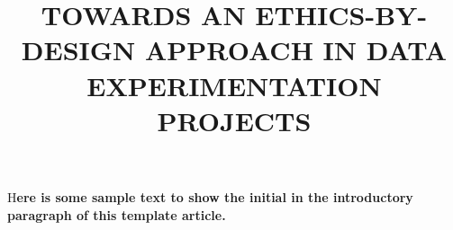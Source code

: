 \documentclass[	DIV=calc,%
							paper=a4,%
							fontsize=11pt,%
							twocolumn, draft]{scrartcl}	 					%
\title{TOWARDS AN ETHICS-BY-DESIGN APPROACH IN DATA EXPERIMENTATION PROJECTS}					%
\date{}																				%
\newcommand{\initial}[1]{%
     \lettrine[lines=3,lhang=0.3,nindent=0em]{
     				\color{DarkGoldenrod}
     				{\textsf{#1}}}{}}
\begin{document}
\maketitle
\initial{H}\textbf{ere is some sample text to show the initial in the introductory paragraph of this template article.}











\end{document}
